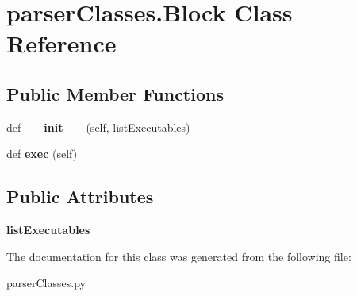 \hypertarget{classparser_classes_1_1_block}{}\section{parser\+Classes.\+Block Class Reference}
\label{classparser_classes_1_1_block}
\subsection*{Public Member Functions}
\begin{DoxyCompactItemize}
\item 
def {\bfseries \+\_\+\+\_\+init\+\_\+\+\_\+} (self, list\+Executables)\hypertarget{classparser_classes_1_1_block_abcf2dbcf84fade861fdb6796668d7665}{}\label{classparser_classes_1_1_block_abcf2dbcf84fade861fdb6796668d7665}

\item 
def {\bfseries exec} (self)\hypertarget{classparser_classes_1_1_block_a4c3aaea61e8faeb4f83f3c534f6033f7}{}\label{classparser_classes_1_1_block_a4c3aaea61e8faeb4f83f3c534f6033f7}

\end{DoxyCompactItemize}
\subsection*{Public Attributes}
\begin{DoxyCompactItemize}
\item 
{\bfseries list\+Executables}\hypertarget{classparser_classes_1_1_block_ae6432948928c58e55813c7ea09f839ad}{}\label{classparser_classes_1_1_block_ae6432948928c58e55813c7ea09f839ad}

\end{DoxyCompactItemize}


The documentation for this class was generated from the following file\+:\begin{DoxyCompactItemize}
\item 
parser\+Classes.\+py\end{DoxyCompactItemize}
